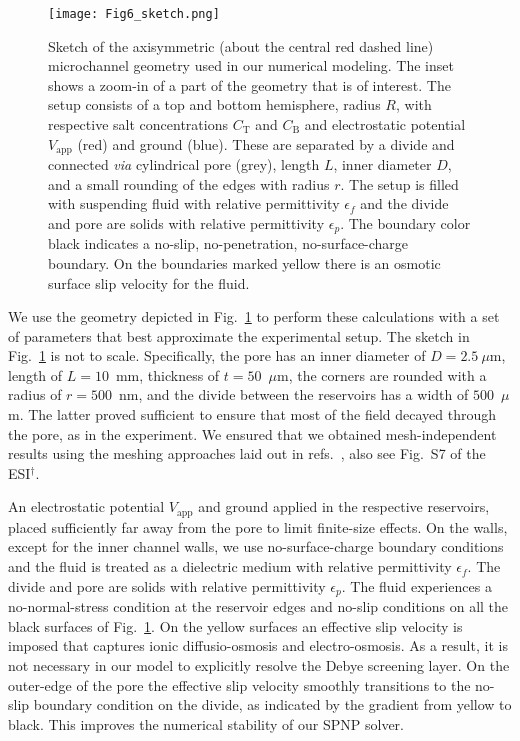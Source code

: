 \documentclass[twoside,twocolumn,9pt]{article}
\begin{document}
\begin{figure}[!h]
 \centering\texttt{[image: Fig6\_sketch.png]}
 \caption{\label{fig:geometry}Sketch of the axisymmetric (about the central red dashed line) microchannel geometry used in our numerical modeling. The inset shows a zoom-in of a part of the geometry that is of interest. The setup consists of a top and bottom hemisphere, radius $R$, with respective salt concentrations $C_{\mathrm{T}}$ and $C_{\mathrm{B}}$ and electrostatic potential $V_{\mathrm{app}}$ (red) and ground (blue). These are separated by a divide and connected \textit{via} cylindrical pore (grey), length $L$, inner diameter $D$, and a small rounding of the edges with radius $r$. The setup is filled with suspending fluid with relative permittivity $\epsilon_{f}$ and the divide and pore are solids with relative permittivity $\epsilon_{p}$. The boundary color black indicates a no-slip, no-penetration, no-surface-charge boundary. On the boundaries marked yellow there is an osmotic surface slip velocity for the fluid.}
\end{figure} 

We use the geometry depicted in Fig.~\ref{fig:geometry} to perform these calculations with a set of parameters that best approximate the experimental setup. The sketch in Fig.~\ref{fig:geometry} is not to scale. 
Specifically, the pore has an inner diameter of $D = 2.5~\mu$m, length of $L = 10$~mm, thickness of $t = 50$~$\mu$m, the corners are rounded with a radius of $r = 500$~nm, and the divide between the reservoirs has a width of $500$~$\mu$m. The latter proved sufficient to ensure that most of the field decayed through the pore, as in the experiment. We ensured that we obtained mesh-independent results using the meshing approaches laid out in refs.~\cite{Joost_rempfer_selective_2016,rempfer_NP_2017}, also see Fig.~S7 of the ESI$^{\dag}$.

An electrostatic potential $V_{\mathrm{app}}$ and ground applied in the respective reservoirs, placed sufficiently far away from the pore to limit finite-size effects. 
On the walls, except for the inner channel walls, we use no-surface-charge boundary conditions and the fluid is treated as a dielectric medium with relative permittivity $\epsilon_{f}$. 
The divide and pore are solids with relative permittivity $\epsilon_{p}$. 
The fluid experiences a no-normal-stress condition at the reservoir edges and no-slip conditions on all the black surfaces of Fig.~\ref{fig:geometry}. 
On the yellow surfaces an effective slip velocity is imposed that captures ionic diffusio-osmosis and electro-osmosis. As a result, it is not necessary in our model to explicitly resolve the Debye screening layer. 
On the outer-edge of the pore the effective slip velocity smoothly transitions to the no-slip boundary condition on the divide, as indicated by the gradient from yellow to black. 
This improves the numerical stability of our SPNP solver.
\end{document}
